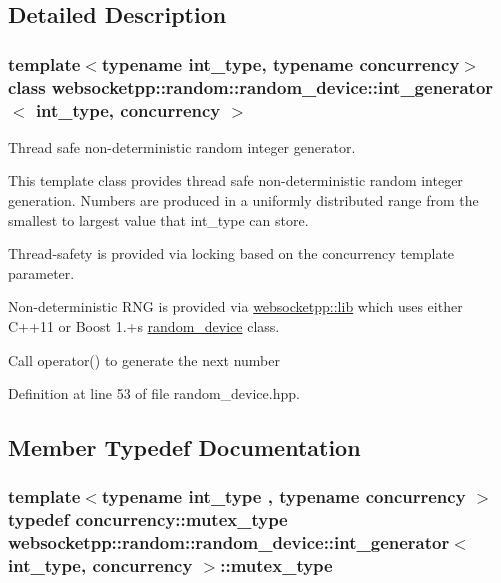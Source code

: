 \subsection{Detailed Description}
\subsubsection*{template$<$typename int\+\_\+type, typename concurrency$>$class websocketpp\+::random\+::random\+\_\+device\+::int\+\_\+generator$<$ int\+\_\+type, concurrency $>$}

Thread safe non-\/deterministic random integer generator. 

This template class provides thread safe non-\/deterministic random integer generation. Numbers are produced in a uniformly distributed range from the smallest to largest value that int\+\_\+type can store.

Thread-\/safety is provided via locking based on the concurrency template parameter.

Non-\/deterministic R\+N\+G is provided via \hyperlink{namespacewebsocketpp_1_1lib}{websocketpp\+::lib} which uses either C++11 or Boost 1.+\textquotesingle{}s \hyperlink{namespacewebsocketpp_1_1random_1_1random__device}{random\+\_\+device} class.

Call operator() to generate the next number 

Definition at line 53 of file random\+\_\+device.\+hpp.



\subsection{Member Typedef Documentation}
\hypertarget{classwebsocketpp_1_1random_1_1random__device_1_1int__generator_a76479f1088f245508e7efce66b3ab51c}{}
\subsubsection[{mutex\+\_\+type}]{\setlength{\rightskip}{0pt plus 5cm}template$<$typename int\+\_\+type , typename concurrency $>$ typedef concurrency\+::mutex\+\_\+type {\bf websocketpp\+::random\+::random\+\_\+device\+::int\+\_\+generator}$<$ int\+\_\+type, concurrency $>$\+::{\bf mutex\+\_\+type}}\label{classwebsocketpp_1_1random_1_1random__device_1_1int__generator_a76479f1088f245508e7efce66b3ab51c}


